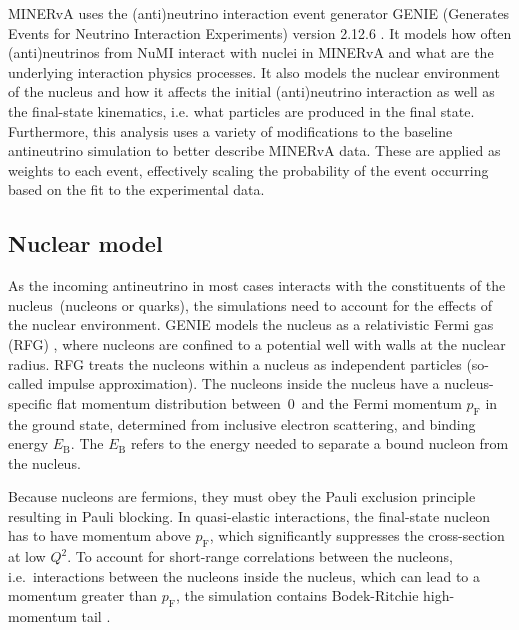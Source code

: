 MINERvA uses the (anti)neutrino interaction event generator GENIE (Generates Events for Neutrino Interaction Experiments) version 2.12.6 \cite{genie_ANDREOPOULOS201087,genie_andreopoulos2015}. It models how often (anti)neu\-tri\-nos from NuMI interact with nuclei in MINERvA and what are the underlying interaction physics processes. It also models the nuclear environment of the nucleus and how it affects the initial (anti)neutrino interaction as well as the final-state kinematics, i.e. what particles are produced in the final state. Furthermore, this analysis uses a variety of modifications to the baseline antineutrino simulation to better describe MINERvA data. These are applied as weights to each event, effectively scaling the probability of the event occurring based on the fit to the experimental data.

\subsection{Nuclear model}

As the incoming antineutrino in most cases interacts with the constituents of the nucleus~(nucleons or quarks), the simulations need to account for the effects of the nuclear environment. GENIE models the nucleus as a relativistic Fermi gas (RFG) \cite{RFG_SMITH1972605}, where nucleons are confined to a potential well with walls at the nuclear radius. RFG treats the nucleons within a nucleus as independent particles (so-called impulse approximation). The nucleons inside the nucleus have a nucleus-specific flat momentum distribution between~0~and the Fermi momentum $p_{\text{F}}$ in the ground state, determined from inclu\-sive electron scattering, and binding energy $E_{\text{B}}$. The $E_{\text{B}}$ refers to the energy needed to sepa\-rate a bound nucleon from the nucleus. 



Because nucleons are fermions, they must obey the Pauli exclusion principle resulting in Pauli blocking. In quasi-elastic interactions, the final-state nucleon has to have momentum above $p_{\text{F}}$, which significantly suppresses the cross-section at low $Q^{2}$. To account for short-range correlations between the nucleons, i.e.~interactions between the nucleons inside the nucleus, which can lead to a momentum greater than $p_{\text{F}}$, the simulation contains Bodek-Ritchie high-momentum tail \cite{BodekRitchie1981_PhysRevD.24.1400}.

